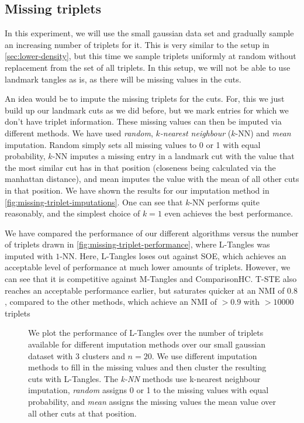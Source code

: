 \subsection{Missing triplets}
In this experiment, we will use the small gaussian data set and gradually sample an increasing number of triplets for it. 
This is very similar to the setup in \autoref{sec:lower-density}, but this time we sample triplets uniformly at random without replacement
from the set of all triplets. In this setup, we will not be able to use landmark tangles as is, as there will be missing values in the cuts. 

An idea would be to impute the missing triplets for the cuts.  For, this we just build up our landmark cuts as we did before,
but we mark entries for which we don't have triplet information. These missing values can then be imputed via different methods.
We have used \textit{random}, \textit{$k$-nearest neighbour }($k$-NN) and \textit{mean} imputation. Random simply sets all missing values to 0 or 1 with equal probability, $k$-NN imputes
a missing entry in a landmark cut with the value that the most similar cut has in that position (closeness being calculated via the manhattan distance), and mean 
imputes the value with the mean of all other cuts in that position. 
We have shown the results for our imputation method in \autoref{fig:missing-triplet-imputations}.  One can see that $k$-NN performs quite reasonably, and the simplest choice of $k=1$ even achieves the best performance.

We have compared the performance of our different algorithms versus the number of triplets drawn in
\autoref{fig:missing-triplet-performance}, where L-Tangles was imputed with $1$-NN. Here, L-Tangles loses out against SOE, which achieves an acceptable level of performance at much lower amounts of triplets. 
However, we can see that it is competitive against M-Tangles and ComparisonHC. T-STE also reaches an acceptable performance earlier, but saturates quicker at an NMI of $0.8$, compared to the other methods, which
achieve an NMI of $>0.9$ with $>10000$ triplets

\begin{figure}[ht]
    \centering
    \resizebox{0.7\textwidth}{!}{}
    \caption{
        We plot the performance of L-Tangles over the number of triplets available for different imputation methods over our small gaussian dataset with $3$ clusters
        and $n=20$. We use different imputation methods to fill in the missing values and then cluster the resulting cuts with L-Tangles.
        The \textit{k-NN} methods use k-nearest neighbour imputation, \textit{random} assigns 0 or 1 to the missing values with equal probability, and \textit{mean} assigns the missing
        values the mean value over all other cuts at that position.
    }
    \label{fig:missing-triplet-imputations}
\end{figure}

